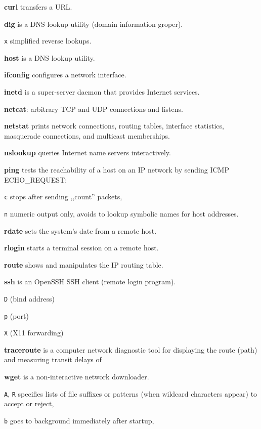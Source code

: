 \begin{enumx}
\item [\cmd] \textbf{curl} transfers a URL.
\item [\cmd] \textbf{dig} is a DNS lookup utility (domain information groper).
\item [\texttt{x}] simplified reverse lookups.
\item [\cmd] \textbf{host} is a DNS lookup utility.  
\item [\cmd] \textbf{ifconfig} configures a network interface.   
\item [\cmd] \textbf{inetd} is a super-server daemon that provides Internet services.
\item [\cmd] \textbf{netcat}: arbitrary TCP and UDP connections and listens.
\item [\cmd] \textbf{netstat} prints network connections, routing tables, 
interface statistics, masquerade connections, and multicast memberships.
\item [\cmd] \textbf{nslookup} queries Internet name servers interactively.
\item [\cmd] \textbf{ping} tests the reachability of a host 
on an IP network by sending ICMP ECHO\_REQUEST:
\item [\texttt{c}] stops after sending ,,count'' packets,
\item [\texttt{n}] numeric output only, 
	avoids to lookup symbolic names for host addresses. 
\item [\cmd] \textbf{rdate} sets the system's date from a remote host.
\item [\cmd] \textbf{rlogin} starts a terminal session on a remote host.
\item [\cmd] \textbf{route} shows and manipulates the IP routing table.
\item [\cmd] \textbf{ssh} is an OpenSSH SSH client (remote login program).
\item [\texttt{D}] (bind address)
\item [\texttt{p}] (port)
\item [\texttt{X}] (X11 forwarding)
\item [\cmd] \textbf{traceroute} is a computer network diagnostic tool for 
displaying the route (path) and measuring transit delays of 
\item [\cmd] \textbf{wget} is a non-interactive network downloader.
\item [\texttt{A}, \texttt{R}] specifies lists 	of file suffixes or 
	patterns (when wildcard characters appear) to accept or reject,
\item [\texttt{b}] goes to background immediately after startup,

\end{enumx}
